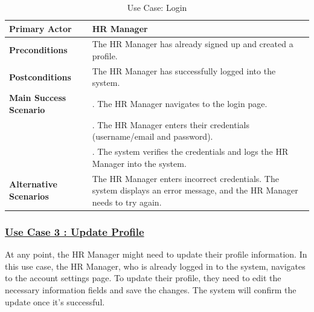 \begin{table}[H]
    \renewcommand{\arraystretch}{1.5}%
    \caption{Use Case: Login}
    \centering
    \medskip
    \begin{tabularx}{\textwidth} {
            | >{\hsize=0.5\hsize\raggedright\arraybackslash}X
            | >{\hsize=1.5\hsize\raggedright\arraybackslash}X |}
        \hline
        \textbf{Primary Actor} & HR Manager \\
        \hline
        \textbf{Preconditions} & The HR Manager has already signed up and created a profile. \\
        \hline
        \textbf{Postconditions} & The HR Manager has successfully logged into the system. \\
        \hline
        \textbf{Main Success Scenario} & 1. The HR Manager navigates to the login page. \\
        & 2. The HR Manager enters their credentials (username/email and password). \\
        & 3. The system verifies the credentials and logs the HR Manager into the system. \\
        \hline
        \textbf{Alternative Scenarios} & The HR Manager enters incorrect credentials. The system displays an error message, and the HR Manager needs to try again. \\
        \hline
    \end{tabularx}
\end{table}


\subsubsection{\underline{Use Case 3 : Update Profile }}
At any point, the HR Manager might need to update their profile information. In this use case, the HR Manager, who is already logged in to the system, navigates to the account settings page. To update their profile, they need to edit the necessary information fields and save the changes. The system will confirm the update once it's successful.

